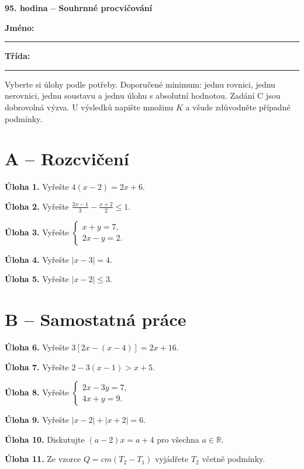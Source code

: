 \documentclass[11pt,a4paper]{article}
\begin{document}
\begin{center}\Large\bfseries 95. hodina -- Souhrnné procvičování\end{center}
\noindent\textbf{Jméno:} \rule{65mm}{0.4pt}\hfill\textbf{Třída:} \rule{24mm}{0.4pt}\par
\small Vyberte si úlohy podle potřeby. Doporučené minimum: jednu rovnici, jednu nerovnici, jednu soustavu a jednu úlohu s absolutní hodnotou. Zadání C jsou dobrovolná výzva. U výsledků napište množinu $K$ a všude zdůvodněte případné podmínky.\normalsize
\section*{A -- Rozcvičení}
\noindent\textbf{Úloha 1.} Vyřešte $4(x-2)=2x+6$.\par\vspace{6mm}
\noindent\textbf{Úloha 2.} Vyřešte $\frac{2x-1}{3}-\frac{x+2}{2}\le1$.\par\vspace{6mm}
\noindent\textbf{Úloha 3.} Vyřešte $\begin{cases}x+y=7,\\2x-y=2.\end{cases}$\par\vspace{6mm}
\noindent\textbf{Úloha 4.} Vyřešte $|x-3|=4$.\par\vspace{6mm}
\noindent\textbf{Úloha 5.} Vyřešte $|x-2|\le3$.\par\vspace{6mm}
\section*{B -- Samostatná práce}
\noindent\textbf{Úloha 6.} Vyřešte $3[2x-(x-4)]=2x+16$.\par\vspace{6mm}
\noindent\textbf{Úloha 7.} Vyřešte $2-3(x-1)>x+5$.\par\vspace{6mm}
\noindent\textbf{Úloha 8.} Vyřešte $\begin{cases}2x-3y=7,\\4x+y=9.\end{cases}$\par\vspace{6mm}
\noindent\textbf{Úloha 9.} Vyřešte $|x-2|+|x+2|=6$.\par\vspace{6mm}
\noindent\textbf{Úloha 10.} Diskutujte $(a-2)x=a+4$ pro všechna $a\in\mathbb R$.\par\vspace{6mm}
\noindent\textbf{Úloha 11.} Ze vzorce $Q=cm(T_2-T_1)$ vyjádřete $T_2$ včetně podmínky.\par\vspace{6mm}
\end{document}
